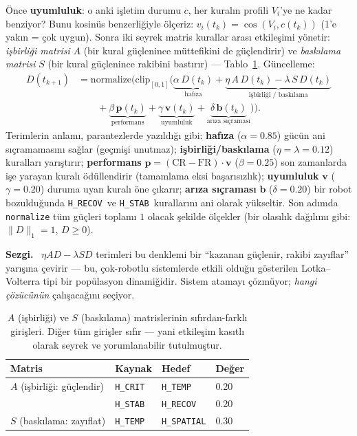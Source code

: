 \documentclass[11pt,a4paper]{article}
\newenvironment{sezgi}
  {\begin{lrbox}{\sezgibox}%
   \begin{minipage}{\dimexpr\linewidth-2\fboxsep-2\fboxrule\relax}%
   \small\textbf{\color{blue!55!black}Sezgi.}~}
  {\end{minipage}\end{lrbox}%
   \par\smallskip\noindent
   \fcolorbox{blue!45!black}{blue!5}{\usebox{\sezgibox}}%
   \par\smallskip}
\newcommand{\Hspatial}{\texttt{H\_SPATIAL}}
\newcommand{\Hcrit}{\texttt{H\_CRIT}}
\newcommand{\Htemp}{\texttt{H\_TEMP}}
\newcommand{\Hstab}{\texttt{H\_STAB}}
\newcommand{\Hrecov}{\texttt{H\_RECOV}}
\begin{document}
Önce \textbf{uyumluluk}: o anki işletim durumu $c$, her kuralın profili $V_i$'ye ne
kadar benziyor? Bunu kosinüs benzerliğiyle ölçeriz:
$v_i(t_k)=\cos(V_i,c(t_k))$ (1'e yakın = çok uygun). Sonra iki seyrek matris
kurallar arası etkileşimi yönetir: \emph{işbirliği matrisi} $A$ (bir kural
güçlenince müttefikini de güçlendirir) ve \emph{baskılama matrisi} $S$ (bir
kural güçlenince rakibini bastırır) --- Tablo~\ref{tab:as}. Güncelleme:
\begin{equation}
\begin{split}
  D(t_{k+1}) &= \mathrm{normalize}\!\Big(\mathrm{clip}_{[0,1]}\!\big(
      \underbrace{\alpha\,D(t_k)}_{\text{hafıza}}
      + \underbrace{\eta\,A\,D(t_k) - \lambda\,S\,D(t_k)}_{\text{işbirliği / baskılama}} \\
      &\qquad + \underbrace{\beta\,\mathbf{p}(t_k)}_{\text{performans}}
      + \underbrace{\gamma\,\mathbf{v}(t_k)}_{\text{uyumluluk}}
      + \underbrace{\delta\,\mathbf{b}(t_k)}_{\text{arıza sıçraması}}
      \big)\Big).
\end{split}
  \label{eq:dominance}
\end{equation}
Terimlerin anlamı, parantezlerde yazıldığı gibi: \textbf{hafıza} ($\alpha=0.85$)
gücün ani sıçramamasını sağlar (geçmişi unutmaz); \textbf{işbirliği/baskılama}
($\eta=\lambda=0.12$) kuralları yarıştırır; \textbf{performans}
$\mathbf{p}=(\mathrm{CR}-\mathrm{FR})\cdot\mathbf{v}$ ($\beta=0.25$) son
zamanlarda işe yarayan kuralı ödüllendirir (tamamlama eksi başarısızlık);
\textbf{uyumluluk} $\mathbf{v}$ ($\gamma=0.20$) duruma uyan kuralı öne çıkarır;
\textbf{arıza sıçraması} $\mathbf{b}$ ($\delta=0.20$) bir robot bozulduğunda
\Hrecov\ ve \Hstab\ kurallarını ani olarak yükseltir. Son adımda
\texttt{normalize} tüm güçleri toplamı $1$ olacak şekilde ölçekler (bir olasılık
dağılımı gibi: $\|D\|_1=1$, $D\ge 0$).

\begin{sezgi}
$\eta AD-\lambda SD$ terimleri bu denklemi bir ``kazanan güçlenir, rakibi
zayıflar'' yarışına çevirir --- bu, çok-robotlu sistemlerde etkili olduğu
gösterilen Lotka--Volterra tipi bir popülasyon dinamiğidir. Sistem atamayı
çözmüyor; \emph{hangi çözücünün} çalışacağını seçiyor.
\end{sezgi}

\begin{table}[t]
\centering
\caption{$A$ (işbirliği) ve $S$ (baskılama) matrislerinin sıfırdan-farklı
girişleri. Diğer tüm girişler sıfır --- yani etkileşim kasıtlı olarak seyrek
ve yorumlanabilir tutulmuştur.}
\label{tab:as}
\small
\begin{tabular}{@{}llll@{}}
\toprule
\textbf{Matris} & \textbf{Kaynak} & \textbf{Hedef} & \textbf{Değer} \\
\midrule
$A$ (işbirliği: güçlendir) & \Hcrit & \Htemp  & 0.20 \\
                           & \Hstab & \Hrecov & 0.20 \\
\midrule
$S$ (baskılama: zayıflat)  & \Htemp & \Hspatial & 0.30 \\
\bottomrule
\end{tabular}
\end{table}
\end{document}
